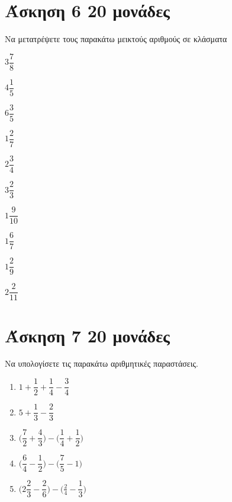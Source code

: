 \documentclass[a4paper,10pt]{report}
\begin{document}
\section*{Άσκηση 6  \hfill \small{20 μονάδες}}
Να μετατρέψετε τους παρακάτω μεικτούς αριθμούς σε κλάσματα
\begin{enumerate}[1)]
\begin{multicols}{2}
 \item $3\dfrac{7}{8}$
 \item $4\dfrac{1}{5}$
 \item $6\dfrac{3}{5}$
 \item $1\dfrac{2}{7}$
 \item $2\dfrac{3}{4}$
 \item $3\dfrac{2}{3}$
 \item $1\dfrac{9}{10}$
 \item $1\dfrac{6}{7}$
 \item $1\dfrac{2}{9}$
 \item $2\dfrac{2}{11}$
\end{multicols}
\end{enumerate}

\section*{Άσκηση 7  \hfill \small{20 μονάδες}}
Να υπολογίσετε τις παρακάτω αριθμητικές παραστάσεις.
\begin{enumerate}[1)]
 \item $1+\dfrac{1}{2}+\dfrac{1}{4}-\dfrac{3}{4}$
 \item $5+\dfrac{1}{3}-\dfrac{2}{3}$
 \item $\biggr(\dfrac{7}{2}+\dfrac{4}{3}\biggl)-\biggr(\dfrac{1}{4}+\dfrac{1}{2}\biggl)$
 \item $\biggr(\dfrac{6}{4}-\dfrac{1}{2}\biggl)-\biggr(\dfrac{7}{5}-1\biggl)$
 \item $\biggr(2\dfrac{2}{3}-\dfrac{2}{6}\biggr)-\biggr(\frac{2}{4}-\dfrac{1}{3}\biggl)$
\end{enumerate}
\end{document}
